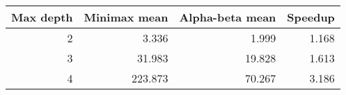 \begin{tabular}{|r|r|r|r|}
    \hline
       Max depth &   Minimax mean &   Alpha-beta mean &   Speedup
     \\
    \hline
               2 &        3.336 &           1.999 &     1.168 \\
               3 &       31.983  &           19.828 &     1.613 \\
               4 &      223.873   &          70.267  &     3.186 \\
    \hline
    \end{tabular}
    